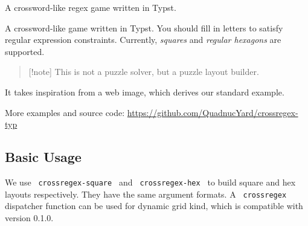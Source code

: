 A crossword-like regex game written in Typst.

\label{readme}
A crossword-like game written in Typst. You should fill in letters to
satisfy regular expression constraints. Currently, \emph{squares} and
\emph{regular hexagons} are supported.

\begin{quote}
{[}!note{]} This is not a puzzle solver, but a puzzle layout builder.
\end{quote}

It takes inspiration from a web image, which derives our standard
example.

\pandocbounded{}

\pandocbounded{}

More examples and source code:
\url{https://github.com/QuadnucYard/crossregex-typ}

\subsection{Basic Usage}\label{basic-usage}

We use \texttt{\ crossregex-square\ } and \texttt{\ crossregex-hex\ } to
build square and hex layouts respectively. They have the same argument
formats. A \texttt{\ crossregex\ } dispatcher function can be used for
dynamic grid kind, which is compatible with version 0.1.0.

\begin{Shaded}
\begin{Highlighting}[]

\NormalTok{  ),}
\NormalTok{  ),}
\NormalTok{)}
\end{Highlighting}
\end{Shaded}

